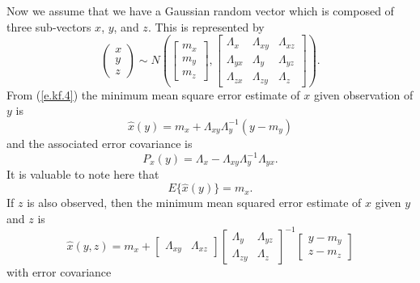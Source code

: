 	Now we assume that we have a Gaussian random
vector which is composed of three sub-vectors $x$, $y$, and $z$.
This is represented by
%
\begin{equation}
\left(\begin{array}{c}x\\y\\z\end{array}\right)
\sim
  N\left(\left[\begin{array}{c}m_x\\m_y\\m_z\end{array}\right],
  \left[\begin{array}{ccc}\Lambda_{x}&\Lambda_{xy}&\Lambda_{xz}\\
                          \Lambda_{yx}&\Lambda_{y}&\Lambda_{yz}\\
                          \Lambda_{zx}&\Lambda_{zy}&\Lambda_{z}
\end{array}
   \right]\right).
\label{e.kf.8}
\end{equation}
%
From (\ref{e.kf.4}) the minimum mean square error estimate of 
$x$ given observation of $y$ is 
%
\begin{equation}
\hat{x}(y)=m_x+\Lambda_{xy}\Lambda_y^{-1}(y-m_y)
\label{e.kf.9}
\end{equation}
%
and the associated error covariance is
%
\begin{equation}
P_x(y)=\Lambda_x-\Lambda_{xy}\Lambda_y^{-1}\Lambda_{yx}.
\label{e.kf.10}
\end{equation}
%
It is valuable to note here that
%
\begin{equation}
E\{\hat{x}(y)\}=m_x.
\label{e.kf.11}
\end{equation}
%
If $z$ is also observed, then the minimum mean squared error estimate 
of $x$ given $y$ and $z$ is
%
\begin{equation}
\hat{x}(y,z)=m_x+[\begin{array}{cc}
\Lambda_{xy}&\Lambda_{xz}\end{array}]
\left[\begin{array}{cc}\Lambda_y & \Lambda_{yz}\\
                       \Lambda_{zy} & \Lambda_{z}\end{array}\right]^{-1}
\left[\begin{array}{c}
y-m_y\\z-m_z\end{array}\right]
\label{e.kf.12}
\end{equation}
%
with error covariance
